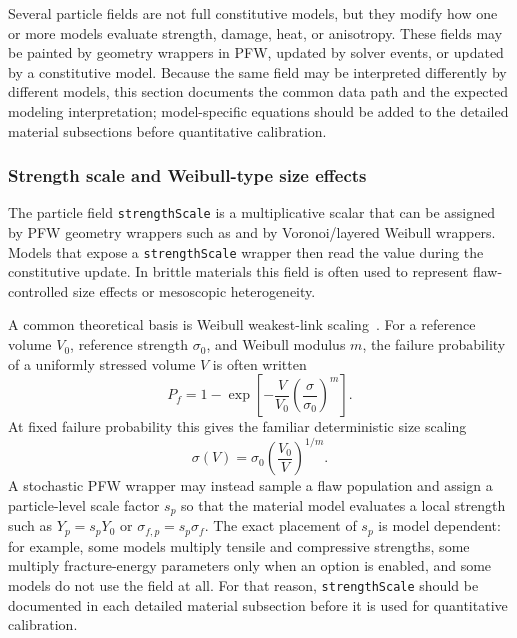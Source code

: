 Several particle fields are not full constitutive models, but they modify how one or more models evaluate strength, damage, heat, or anisotropy.  These fields may be painted by geometry wrappers in PFW, updated by solver events, or updated by a constitutive model.  Because the same field may be interpreted differently by different models, this section documents the common data path and the expected modeling interpretation; model-specific equations should be added to the detailed material subsections before quantitative calibration.

\subsubsection{Strength scale and Weibull-type size effects}
\label{subsubsec:strength-scale-weibull}

The particle field \texttt{strengthScale} is a multiplicative scalar that can be assigned by PFW geometry wrappers such as  and by Voronoi/layered Weibull wrappers.  Models that expose a \texttt{strengthScale} wrapper then read the value during the constitutive update.  In brittle materials this field is often used to represent flaw-controlled size effects or mesoscopic heterogeneity.

A common theoretical basis is Weibull weakest-link scaling~\cite{weibull1951}.  For a reference volume \(V_0\), reference strength \(\sigma_0\), and Weibull modulus \(m\), the failure probability of a uniformly stressed volume \(V\) is often written
\begin{equation}
  P_f = 1 - \exp\left[-\frac{V}{V_0}\left(\frac{\sigma}{\sigma_0}\right)^m\right].
  \label{eq:weibull-failure-probability}
\end{equation}
At fixed failure probability this gives the familiar deterministic size scaling
\begin{equation}
  \sigma(V) = \sigma_0\left(\frac{V_0}{V}\right)^{1/m}.
  \label{eq:weibull-size-scaling}
\end{equation}
A stochastic PFW wrapper may instead sample a flaw population and assign a particle-level scale factor \(s_p\) so that the material model evaluates a local strength such as \(Y_p=s_pY_0\) or \(\sigma_{f,p}=s_p\sigma_f\).  The exact placement of \(s_p\) is model dependent: for example, some models multiply tensile and compressive strengths, some multiply fracture-energy parameters only when an option is enabled, and some models do not use the field at all.  For that reason, \texttt{strengthScale} should be documented in each detailed material subsection before it is used for quantitative calibration.


